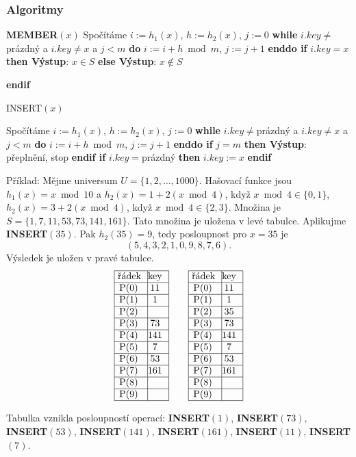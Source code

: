 \documentclass[a4paper,12pt]{article}
\begin{document}
\subsubsection{Algoritmy}


{\bf MEMBER$(x)$}\newline 
Spočítáme $i:=h_1(x)$, $h:=h_2(x)$, $j:=0$\newline 
{\bf while} $i.key\ne$prázdný a $i.key\ne x$ a $j<m$ {\bf do} $
i:=i+h\bmod m$, $j:=j+1$ {\bf enddo\newline 
if} $i.key=x$ {\bf then Výstup}: $x\in S$ {\bf else Výstup}: $
x\notin S$ {\bf endif


INSERT$(x)$}\newline 
Spočítáme $i:=h_1(x)$, $h:=h_2(x)$, $j:=0$\newline 
{\bf while} $i.key\ne$prázdný a $i.key\ne x$ a $j<m$ {\bf do} $
i:=i+h\bmod m$, $j:=j+1$ {\bf enddo\newline 
if} $j=m$ {\bf then Výstup}: přeplnění, stop {\bf endif\newline 
if} $i.key=$prázdný {\bf then} $i.key:=x$ {\bf endif}


Příklad: Mějme universum $U=\{1,2,\dots,1000
\}$. 
Hašovací funkce jsou 
$h_1(x)=x\bmod10$ a $h_2(x)=1+2(x\bmod4)$, když 
$x\bmod4\in \{0,1\}$, $h_2(x)=3+2(x\bmod4)$, když $x\bmod4\in 
\{2,3\}$. 
Množina je  $S=\{1,7,11,53,73,141,161\}$. Tato množina je uložena v 
levé tabulce. Aplikujme {\bf INSERT$(35)$}. Pak $h_2(35)=9$, tedy 
posloupnost pro $x=35$ je 
$$(5,4,3,2,1,0,9,8,7,6).$$
Výsledek je uložen v pravé tabulce. 
$$\vbox {\hbox{\vtop{\offinterlineskip\halign{\strut\vrule\ # & \vrule\hfil# \hfil\vrule\cr\noalign{\hrule}řádek & key \hfil\cr\noalign{\hrule}P(0) & 11 \cr\noalign{\hrule}P(1) & 1 \cr\noalign{\hrule}P(2) & \hfill \cr\noalign{\hrule}P(3) & 73 \cr\noalign{\hrule}P(4) & 141 \cr\noalign{\hrule}P(5) & 7 \cr\noalign{\hrule}P(6) & 53 \cr\noalign{\hrule}P(7) & 161 \cr\noalign{\hrule}P(8) & \hfill\cr\noalign{\hrule}P(9) & \hfill \cr\noalign{\hrule}}}\qquad\vtop{\offinterlineskip\halign {\strut\vrule\ # & \vrule \hfil # \hfil \vrule\cr\noalign{\hrule}řádek & key \hfil \cr\noalign{\hrule}P(0) & 11 \cr\noalign{\hrule}P(1) & 1 \cr\noalign{\hrule}P(2) & 35 \cr\noalign{\hrule}P(3) & 73 \cr\noalign{\hrule}P(4) & 141 \cr\noalign{\hrule}P(5) & 7 \cr\noalign{\hrule}P(6) & 53 \cr\noalign{\hrule}P(7) & 161 \cr\noalign{\hrule}P(8) & \hfill \cr\noalign{\hrule}P(9) & \hfill \cr\noalign{\hrule}}}}}$$

Tabulka vznikla posloupností operací:\newline 
{\bf INSERT$(1)$}, {\bf INSERT$(73)$}, {\bf INSERT$(53)$}, 
{\bf INSERT$(141)$}, {\bf INSERT$(161)$},\newline 
{\bf INSERT$(11)$}, {\bf INSERT$(7)$}. 
\end{document}
